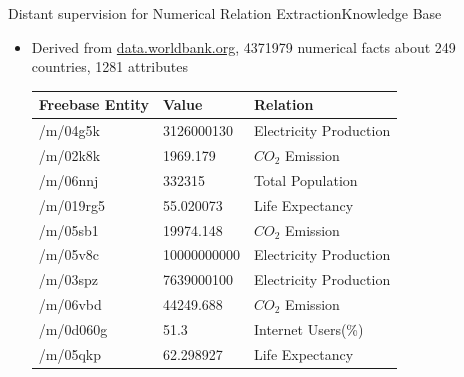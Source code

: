 \documentclass{beamer}
\begin{document}
\begin{frame}{Distant supervision for Numerical Relation Extraction}{Knowledge Base}
 \begin{itemize}
  \item Derived from \url{data.worldbank.org}, 4371979 numerical facts about 249 countries, 1281 attributes 
\begin{center}
\begin{tabular}{|l|l|l|}
\hline
Freebase Entity& Value & Relation\\
\hline
/m/04g5k&3126000130&Electricity Production\\
/m/02k8k&1969.179&$CO_{2}$ Emission\\
/m/06nnj&332315&Total Population\\
/m/019rg5&55.020073&Life Expectancy\\
/m/05sb1&19974.148&$CO_{2}$ Emission\\
/m/05v8c&10000000000&Electricity Production\\
/m/03spz&7639000100&Electricity Production\\
/m/06vbd&44249.688&$CO_{2}$ Emission\\
/m/0d060g&51.3&Internet Users(\%)\\
/m/05qkp&62.298927&Life Expectancy\\
\hline
\end{tabular}
\end{center}

\end{itemize}

\end{frame}
\end{document}
